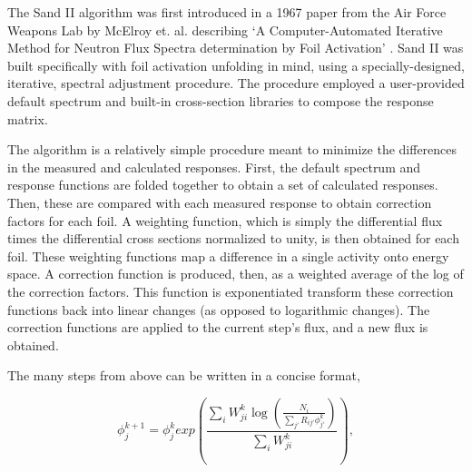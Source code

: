 The Sand II algorithm was first introduced in a 1967 paper from the Air Force Weapons Lab by McElroy et. al. describing `A Computer-Automated Iterative Method for Neutron Flux Spectra determination by Foil Activation' \cite{mcelroy1967computer}.
Sand II was built specifically with foil activation unfolding in mind, using a specially-designed, iterative, spectral adjustment procedure.
The procedure employed a user-provided default spectrum and built-in cross-section libraries to compose the response matrix.

The algorithm is a relatively simple procedure meant to minimize the differences in the measured and calculated responses.
First, the default spectrum and response functions are folded together to obtain a set of calculated responses.
Then, these are compared with each measured response to obtain correction factors for each foil.
A weighting function, which is simply the differential flux times the differential cross sections normalized to unity, is then obtained for each foil.
These weighting functions map a difference in a single activity onto energy space.
A correction function is produced, then, as a weighted average of the log of the correction factors.
This function is exponentiated transform these correction functions back into linear changes (as opposed to logarithmic changes). 
The correction functions are applied to the current step's flux, and a new flux is obtained.

The many steps from above can be written in a concise format,

\begin{equation}
\label{eqn:sandii}
\phi_j^{k + 1} = \phi_j^{k} exp(\frac{\sum_i W_{ji}^k \log(\frac{N_i}{\sum_{j'} R_{ij'} \phi_{j'}^k})}{\sum_i W_{ji}^k}) ,
\end{equation}

